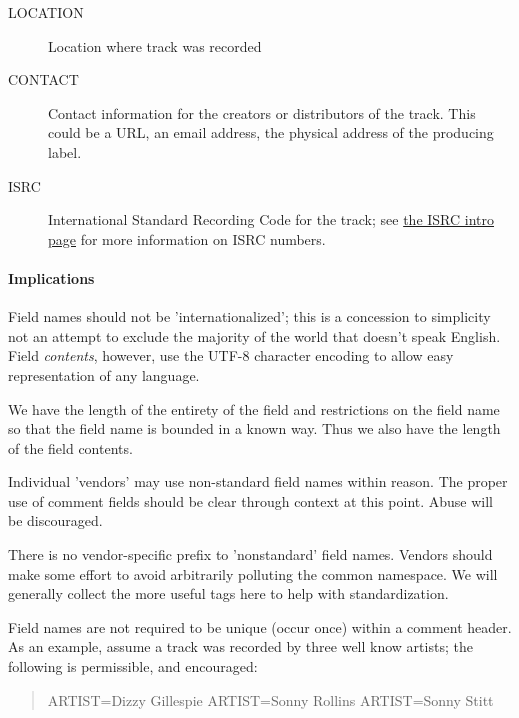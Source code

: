 \begin{description}
\item[LOCATION]
	Location where track was recorded

\item[CONTACT]
	Contact information for the creators or distributors of the track. This could be a URL, an email address, the physical address of the producing label.

\item[ISRC]
	International Standard Recording Code for the
track; see \href{https://isrc.ifpi.org/}{the ISRC
intro page} for more information on ISRC numbers.

\end{description}



\paragraph{Implications}

Field names should not be 'internationalized'; this is a
concession to simplicity not an attempt to exclude the majority of
the world that doesn't speak English. Field \emph{contents},
however, use the UTF-8 character encoding to allow easy representation
of any language.

We have the length of the entirety of the field and restrictions on
the field name so that the field name is bounded in a known way. Thus
we also have the length of the field contents.

Individual 'vendors' may use non-standard field names within
reason. The proper use of comment fields should be clear through
context at this point.  Abuse will be discouraged.

There is no vendor-specific prefix to 'nonstandard' field names.
Vendors should make some effort to avoid arbitrarily polluting the
common namespace. We will generally collect the more useful tags
here to help with standardization.

Field names are not required to be unique (occur once) within a
comment header.  As an example, assume a track was recorded by three
well know artists; the following is permissible, and encouraged:

\begin{quote}
\begin{programlisting}
ARTIST=Dizzy Gillespie
ARTIST=Sonny Rollins
ARTIST=Sonny Stitt
\end{programlisting}
\end{quote}







